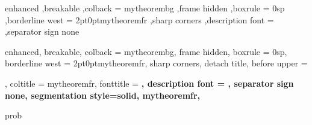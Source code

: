 {%
	enhanced
	,breakable
	,colback = mytheorembg
	,frame hidden
	,boxrule = 0sp
	,borderline west = {2pt}{0pt}{mytheoremfr}
	,sharp corners
	,description font = \mdseries
	,separator sign none
}



{%
    enhanced,
    breakable,
    colback = mytheorembg,
    frame hidden,
    boxrule = 0sp,
    borderline west = {2pt}{0pt}{mytheoremfr},
    sharp corners,
    detach title,
    before upper = \tcbtitle\par\smallskip,
    coltitle = mytheoremfr,
    fonttitle = \bfseries\sffamily,
    description font = \mdseries,
    separator sign none,
    segmentation style={solid, mytheoremfr},
}
{prob}







